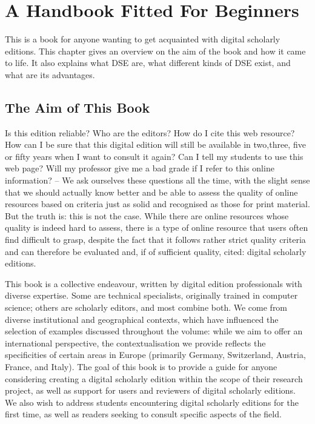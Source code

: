 \documentclass[
  letterpaper,
  DIV=11,
  numbers=noendperiod]{scrreprt}
\begin{document}
\section{A Handbook Fitted For
Beginners}\label{a-handbook-fitted-for-beginners}

This is a book for anyone wanting to get acquainted with digital
scholarly editions. This chapter gives an overview on the aim of the
book and how it came to life. It also explains what DSE are, what
different kinds of DSE exist, and what are its advantages.

\subsection{The Aim of This Book}\label{the-aim-of-this-book}

Is this edition reliable? Who are the editors? How do I cite this web
resource? How can I be sure that this digital edition will still be
available in two,three, five or fifty years when I want to consult it
again? Can I tell my students to use this web page? Will my professor
give me a bad grade if I refer to this online information? -- We ask
ourselves these questions all the time, with the slight sense that we
should actually know better and be able to assess the quality of online
resources based on criteria just as solid and recognised as those for
print material. But the truth is: this is not the case. While there are
online resources whose quality is indeed hard to assess, there is a type
of online resource that users often find difficult to grasp, despite the
fact that it follows rather strict quality criteria and can therefore be
evaluated and, if of sufficient quality, cited: digital scholarly
editions.

This book is a collective endeavour, written by digital edition
professionals with diverse expertise. Some are technical specialists,
originally trained in computer science; others are scholarly editors,
and most combine both. We come from diverse institutional and
geographical contexts, which have influenced the selection of examples
discussed throughout the volume: while we aim to offer an international
perspective, the contextualisation we provide reflects the specificities
of certain areas in Europe (primarily Germany, Switzerland, Austria,
France, and Italy). The goal of this book is to provide a guide for
anyone considering creating a digital scholarly edition within the scope
of their research project, as well as support for users and reviewers of
digital scholarly editions. We also wish to address students
encountering digital scholarly editions for the first time, as well as
readers seeking to consult specific aspects of the field.
\end{document}
